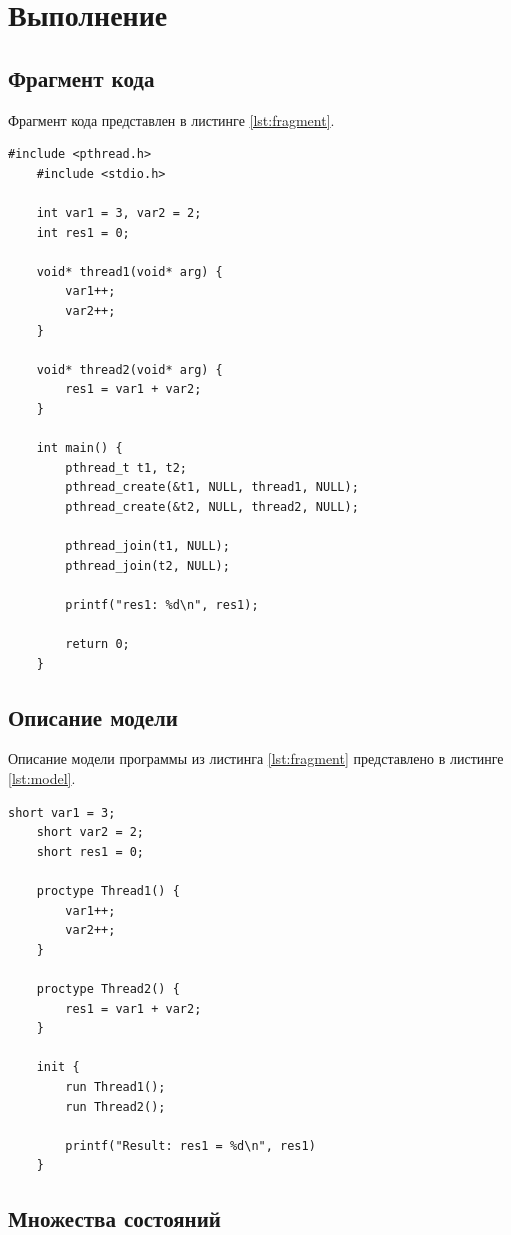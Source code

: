 \section{Выполнение}

\subsection{Фрагмент кода}

Фрагмент кода представлен в листинге \ref{lst:fragment}.

\begin{lstlisting}[label=lst:fragment,caption=Фрагмент кода.]
	#include <pthread.h>
	#include <stdio.h>

	int var1 = 3, var2 = 2;
	int res1 = 0;

	void* thread1(void* arg) {
		var1++;
		var2++;
	}

	void* thread2(void* arg) {
		res1 = var1 + var2;
	}

	int main() {
		pthread_t t1, t2;
		pthread_create(&t1, NULL, thread1, NULL);
		pthread_create(&t2, NULL, thread2, NULL);

		pthread_join(t1, NULL);
		pthread_join(t2, NULL);

		printf("res1: %d\n", res1);

		return 0;
	}
\end{lstlisting}

\subsection{Описание модели}

Описание модели программы из листинга \ref{lst:fragment} представлено в листинге \ref{lst:model}.
\newpage
\begin{lstlisting}[label=lst:model,caption=Описание модели.]
	short var1 = 3;
	short var2 = 2;
	short res1 = 0;

	proctype Thread1() {
		var1++;
		var2++;
	}

	proctype Thread2() {
		res1 = var1 + var2;
	}

	init {
		run Thread1();
		run Thread2();

		printf("Result: res1 = %d\n", res1)
	}
\end{lstlisting}

\subsection{Множества состояний}

